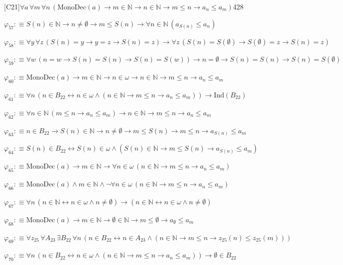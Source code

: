\begin{fullproof}{[C21]}{$\forall a\,\forall m\,\forall n\,(\mathrm{MonoDec}(a) \to m \in \mathbb{N} \to n \in \mathbb{N} \to m \leq n \to a_{n} \leq a_{m})$}{428}
\begin{abbrevlist}
\item $\varphi_{57} :\equiv S(n) \in \mathbb{N} \to n \neq \emptyset \to m \leq S(n) \to \forall n \in \mathbb{N}\,(a_{S(n)} \leq a_{n})$
\item $\varphi_{58} :\equiv \forall y\,\forall z\,(S(n) = y \to y = z \to S(n) = z) \to \forall z\,(S(n) = S(\emptyset) \to S(\emptyset) = z \to S(n) = z)$
\item $\varphi_{59} :\equiv \forall w\,(n = w \to S(n) = S(n) \to S(n) = S(w)) \to n = \emptyset \to S(n) = S(n) \to S(n) = S(\emptyset)$
\item $\varphi_{60} :\equiv \mathrm{MonoDec}(a) \to m \in \mathbb{N} \to n \in \omega \to n \in \mathbb{N} \to m \leq n \to a_{n} \leq a_{m}$
\item $\varphi_{61} :\equiv \forall n\,(n \in B_{22} \leftrightarrow n \in \omega \land (n \in \mathbb{N} \to m \leq n \to a_{n} \leq a_{m})) \to \mathrm{Ind}(B_{22})$
\item $\varphi_{62} :\equiv \forall n \in \mathbb{N}\,(m \leq n \to a_{n} \leq a_{m}) \to n \in \mathbb{N} \to m \leq n \to a_{n} \leq a_{m}$
\item $\varphi_{63} :\equiv n \in B_{22} \to S(n) \in \mathbb{N} \to n \neq \emptyset \to m \leq S(n) \to m \leq n \to a_{S(n)} \leq a_{m}$
\item $\varphi_{64} :\equiv S(n) \in B_{22} \leftrightarrow S(n) \in \omega \land (S(n) \in \mathbb{N} \to m \leq S(n) \to a_{S(n)} \leq a_{m})$
\item $\varphi_{65} :\equiv \mathrm{MonoDec}(a) \to m \in \mathbb{N} \to \forall n \in \omega\,(n \in \mathbb{N} \to m \leq n \to a_{n} \leq a_{m})$
\item $\varphi_{66} :\equiv \mathrm{MonoDec}(a) \land m \in \mathbb{N} \land \neg \forall n \in \omega\,(n \in \mathbb{N} \to m \leq n \to a_{n} \leq a_{m})$
\item $\varphi_{67} :\equiv \forall n\,(n \in \mathbb{N} \leftrightarrow n \in \omega \land n \neq \emptyset) \to (n \in \mathbb{N} \leftrightarrow n \in \omega \land n \neq \emptyset)$
\item $\varphi_{68} :\equiv \mathrm{MonoDec}(a) \to m \in \mathbb{N} \to \emptyset \in \mathbb{N} \to m \leq \emptyset \to a_{\emptyset} \leq a_{m}$
\item $\varphi_{69} :\equiv \forall z_{25}\,\forall A_{23}\,\exists B_{22}\,\forall n\,(n \in B_{22} \leftrightarrow n \in A_{23} \land (n \in \mathbb{N} \to m \leq n \to z_{25}(n) \leq z_{25}(m)))$
\item $\varphi_{70} :\equiv \forall n\,(n \in B_{22} \leftrightarrow n \in \omega \land (n \in \mathbb{N} \to m \leq n \to a_{n} \leq a_{m})) \to \emptyset \in B_{22}$

\end{abbrevlist}
\end{fullproof}
